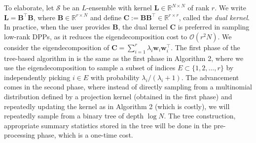 {
 To elaborate, let $\mathcal S$ be an $L$-ensemble with kernel $\mathbf{L}\in\mathbb{R}^{N\times N}$ of rank $r$. We write $\mathbf{L}=\mathbf{B}^\top \mathbf{B}$, where $\mathbf{B}\in\mathbb{R}^{r\times N}$ and define $\mathbf{C}:=\mathbf{B}\mathbf{B}^\top \in \mathbb{R}^{r\times r}$, called the \textit{dual kernel}. In practice, when the user provides $\mathbf{B}$, the dual kernel $\mathbf{C}$ is preferred in sampling low-rank DPPs, as it reduces the eigendecomposition cost to $\mathcal{O}(r^2N)$. We consider the eigendecomposition of $\mathbf{C}=\sum_{i=1}^r \lambda_i \mathbf{w}_i\mathbf{w}_i^\top$. The first phase of the tree-based algorithm in \cite{kulesza-gillenwater} is the same as the first phase in Algorithm 2, where we use the eigendecomposition to sample a subset of indices $E\subset\{1,2,\ldots,r\}$ by independently picking $i\in E$ with probability $\lambda_i/(\lambda_i+1)$. The advancement comes in the second phase, where instead of directly sampling from a multinomial distribution defined by a projection kernel (obtained in the first phase) and repeatedly updating the kernel as in Algorithm 2 (which is costly), we will repeatedly sample from a binary tree of depth $\log N$. The tree construction, appropriate summary statistics stored in the tree will be done in the pre-processing phase, which is a one-time cost.  }

